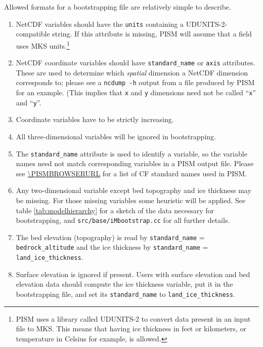 Allowed formats for a bootstrapping file are relatively simple to describe. 
\begin{enumerate}
\item NetCDF variables should have the \texttt{units} containing a
  UDUNITS-2-compatible string. If this attribute is missing, PISM will assume
  that a field uses MKS units.\footnote{PISM uses a library called UDUNITS-2 to convert data present in an input file to MKS.   This means that having ice thickness in feet or kilometers, or temperature in Celsius for example, is allowed.}
\item NetCDF coordinate variables should have \texttt{standard_name} or
  \texttt{axis} attributes. These are used to
  determine which \emph{spatial} dimension a NetCDF dimension corresponds to;
  please see a \texttt{ncdump -h} output from a file produced by PISM for an example. (This implies
  that \texttt{x} and \texttt{y} dimensions need not be called ``\texttt{x}''
  and ``\texttt{y}''.
\item Coordinate variables have to be strictly increasing.
\item All three-dimensional variables will be ignored in bootstrapping.
\item The \texttt{standard_name} attribute is used to identify a variable, so
  the variable names need not match corresponding variables in a
  PISM output file. Please see \url{\PISMBROWSERURL} for a list of CF standard
  names used in PISM.
\item Any two-dimensional variable except bed topography and ice thickness may
  be missing. For those missing variables some heuristic will be applied. See
  table \ref{tab:modelhierarchy} for a sketch of the data necessary for
  bootstrapping, and \texttt{src/base/iMbootstrap.cc} for all further details.
\item The bed elevation (topography) is read by \texttt{standard_name} =
  \texttt{bedrock_altitude} and the ice thickness by \texttt{standard_name} =
  \texttt{land_ice_thickness}.
\item Surface elevation is ignored if present. Users with surface elevation and
  bed elevation data should compute the ice thickness variable, put it in the
  bootstrapping file, and set its \texttt{standard_name} to \texttt{land_ice_thickness}.
\end{enumerate}
